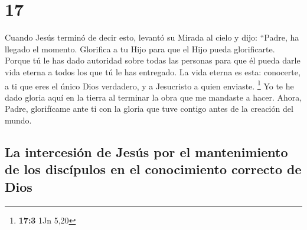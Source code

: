 \hypertarget{section-16}{%
\section{17}\label{section-16}}

 Cuando Jesús terminó de decir esto, levantó su Mirada al
cielo y dijo: ``Padre, ha llegado el momento. Glorifica a tu Hijo para
que el Hijo pueda glorificarte.  Porque tú le has dado
autoridad sobre todas las personas para que él pueda darle vida eterna a
todos los que tú le has entregado.  La vida eterna es
esta: conocerte, a ti que eres el único Dios verdadero, y a Jesucristo a
quien enviaste. \footnote{\textbf{17:3} 1Jn 5,20}  Yo te
he dado gloria aquí en la tierra al terminar la obra que me mandaste a
hacer.  Ahora, Padre, glorifícame ante ti con la gloria
que tuve contigo antes de la creación del mundo.

\hypertarget{la-intercesiuxf3n-de-jesuxfas-por-el-mantenimiento-de-los-discuxedpulos-en-el-conocimiento-correcto-de-dios}{%
\subsection{La intercesión de Jesús por el mantenimiento de los
discípulos en el conocimiento correcto de
Dios}\label{la-intercesiuxf3n-de-jesuxfas-por-el-mantenimiento-de-los-discuxedpulos-en-el-conocimiento-correcto-de-dios}}

